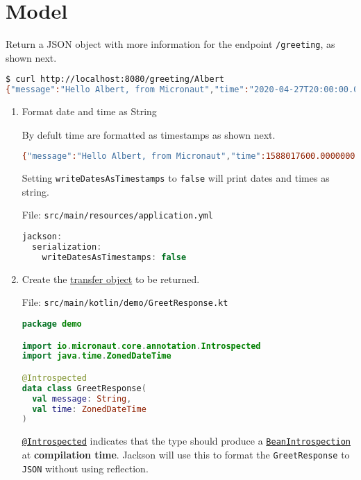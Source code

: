 \section{Model}\label{sec:model}

Return a JSON object with more information for the endpoint \texttt{/greeting}, as shown next.

\begin{lstlisting}[language=bash]
$ curl http://localhost:8080/greeting/Albert
{"message":"Hello Albert, from Micronaut","time":"2020-04-27T20:00:00.000+02:00"}
\end{lstlisting}

\begin{enumerate}

\item Format date and time as String

By defult time are formatted as timestamps as shown next.

\begin{lstlisting}[language=bash]
{"message":"Hello Albert, from Micronaut","time":1588017600.000000000}
\end{lstlisting}

Setting \texttt{writeDatesAsTimestamps} to \texttt{false} will print dates and times as string.

File: \texttt{src/main/resources/application.yml}
\begin{lstlisting}[language=Kotlin]
jackson:
  serialization:
    writeDatesAsTimestamps: false
\end{lstlisting}

\item Create the \href{https://en.wikipedia.org/wiki/Data_transfer_object}{transfer object} to be returned.

File: \texttt{src/main/kotlin/demo/GreetResponse.kt}
\begin{lstlisting}[language=Kotlin]
package demo

import io.micronaut.core.annotation.Introspected
import java.time.ZonedDateTime

@Introspected
data class GreetResponse(
  val message: String,
  val time: ZonedDateTime
)
\end{lstlisting}

\href{https://docs.micronaut.io/2.0.0.M2/api/io/micronaut/core/annotation/Introspected.html}{\texttt{@Introspected}} indicates that the type should produce a \href{https://docs.micronaut.io/2.0.0.M2/api/io/micronaut/core/beans/BeanIntrospection.html}{\texttt{BeanIntrospection}} at \textbf{compilation time}.  Jackson will use this to format the \texttt{GreetResponse} to \texttt{JSON} without using reflection.


\end{enumerate}
